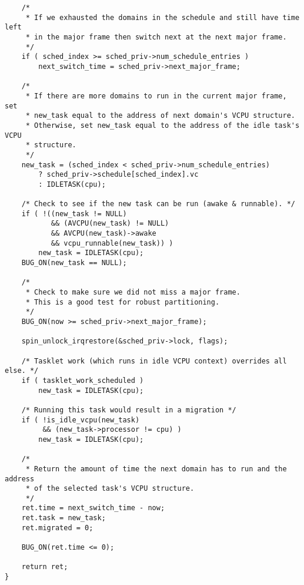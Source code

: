 \begin{appendices}
\begin{lstlisting}
    /*
     * If we exhausted the domains in the schedule and still have time left
     * in the major frame then switch next at the next major frame.
     */
    if ( sched_index >= sched_priv->num_schedule_entries )
        next_switch_time = sched_priv->next_major_frame;

    /*
     * If there are more domains to run in the current major frame, set
     * new_task equal to the address of next domain's VCPU structure.
     * Otherwise, set new_task equal to the address of the idle task's VCPU
     * structure.
     */
    new_task = (sched_index < sched_priv->num_schedule_entries)
        ? sched_priv->schedule[sched_index].vc
        : IDLETASK(cpu);

    /* Check to see if the new task can be run (awake & runnable). */
    if ( !((new_task != NULL)
           && (AVCPU(new_task) != NULL)
           && AVCPU(new_task)->awake
           && vcpu_runnable(new_task)) )
        new_task = IDLETASK(cpu);
    BUG_ON(new_task == NULL);

    /*
     * Check to make sure we did not miss a major frame.
     * This is a good test for robust partitioning.
     */
    BUG_ON(now >= sched_priv->next_major_frame);

    spin_unlock_irqrestore(&sched_priv->lock, flags);

    /* Tasklet work (which runs in idle VCPU context) overrides all else. */
    if ( tasklet_work_scheduled )
        new_task = IDLETASK(cpu);

    /* Running this task would result in a migration */
    if ( !is_idle_vcpu(new_task)
         && (new_task->processor != cpu) )
        new_task = IDLETASK(cpu);

    /*
     * Return the amount of time the next domain has to run and the address
     * of the selected task's VCPU structure.
     */
    ret.time = next_switch_time - now;
    ret.task = new_task;
    ret.migrated = 0;

    BUG_ON(ret.time <= 0);

    return ret;
}
\end{lstlisting}
\end{appendices}
